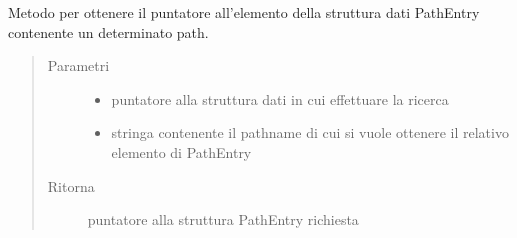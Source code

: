 \documentclass[letterpaper,10pt,italian,openany,oneside]{sphinxmanual}
\begin{document}

\begin{fulllineitems}
\label{\detokenize{code/datastructure:c.getPathEntry}}
Metodo per ottenere il puntatore all’elemento della struttura dati PathEntry contenente un determinato path.
\begin{quote}\begin{description}
\item[{Parametri}] \leavevmode\begin{itemize}
\item {} 
 \textendash{} puntatore alla struttura dati in cui effettuare la ricerca

\item {} 
 \textendash{} stringa contenente il pathname di cui si vuole ottenere il relativo elemento di PathEntry

\end{itemize}

\item[{Ritorna}] \leavevmode
puntatore alla struttura PathEntry richiesta

\end{description}\end{quote}

\end{fulllineitems}

\end{document}
